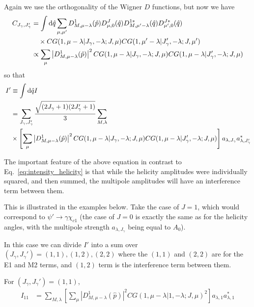 \documentclass[11pt]{article}
\begin{document}
Again we use the orthogonality of the Wigner $D$ functions, but 
now we have
\begin{align}
C_{J_{\gamma},J_{\gamma}'} &= \int
\mathrm{d} \hat{q} \sum_{\mu, \mu'} D^{1}_{M,\mu-\lambda}(\hat{p})
D^{J}_{\mu,0}(\hat{q}) D^{1 \ast}_{M,\mu'-\lambda}(\hat{q}) D^{J
  \ast}_{\mu',0}(\hat{q}) \notag \\
& \ \ \  \times CG(1,\mu-\lambda|J_{\gamma},-\lambda;J,\mu)
CG(1,\mu'-\lambda|J_{\gamma}',-\lambda;J,\mu') \\
&\propto \sum_{\mu} \left| D^{1}_{M,\mu-\lambda}(\hat{p}) \right|^{2}
CG(1,\mu-\lambda|J_{\gamma},-\lambda;J,\mu)
CG(1,\mu-\lambda|J_{\gamma}',-\lambda;J,\mu)
\end{align}
so that
\begin{align}
  I' &\equiv \int \mathrm{d} \hat{q} I \\
  &= \sum_{J_{\gamma},J_{\gamma}'} 
  \frac{\sqrt{(2J_{\gamma}+1)(2J_{\gamma}'+1)}}{3} \sum_{M,\lambda}  \notag \\
  \ \ \ &\times \left[ \sum_{\mu} \left| D^{1}_{M,\mu-\lambda}(\hat{p})
    \right|^{2}
    CG(1,\mu-\lambda|J_{\gamma},-\lambda;J,\mu)
    CG(1,\mu-\lambda|J_{\gamma}',-\lambda;J,\mu) \right]
  a_{\lambda,J_{\gamma}}
  a_{\lambda,J_{\gamma}'}^{\ast}
\end{align}

The important feature of the above equation in contrast to
Eq.~\ref{eq:intensity_helicity} is that while the helicity amplitudes
were individually squared, and then summed, the multipole amplitudes
will have an interference term between them.

This is illustrated in the examples below. Take the case of $J=1$,
which would correspond to $\psi' \to \gamma \chi_{c1}$ (the case of
$J=0$ is exactly the same as for the helicity angles, with the
multipole strength $a_{\lambda,J_{\gamma}}$ being equal to $A_{0}$).

In this case we can divide $I'$ into a sum over
$(J_{\gamma},J_{\gamma}') = (1,1), (1,2), (2,2)$ where the $(1,1)$ and
$(2,2)$ are for the E1 and M2 terms, and $(1,2)$
term is the interference term between them.

For $(J_{\gamma},J_{\gamma}') = (1,1)$, 
\begin{align}
  I_{11} &= \sum_{M,\lambda} \left[ \sum_{\mu} \left| D^{1}_{M,\mu-\lambda}(\hat{p})
    \right|^{2}
    CG(1,\mu-\lambda|1,-\lambda;J,\mu)^{2}
    \right]
  a_{\lambda,1}
  a_{\lambda,1}^{\ast}
\end{align}
\end{document}
